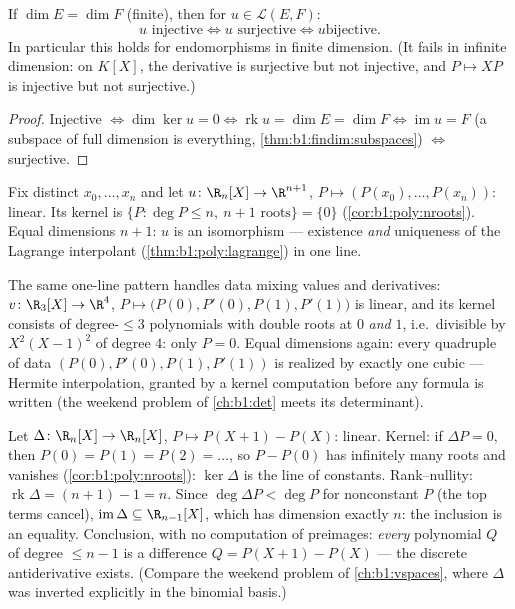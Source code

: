 \begin{corollary}\label{cor:b1:linmaps:samedim}
If $\dim E = \dim F$ (finite), then for $u \in \mathcal{L}(E, F)$:
\[
u \text{ injective} \iff u \text{ surjective} \iff u \text{
bijective}.
\]
In particular this holds for endomorphisms in finite dimension. (It
fails in infinite dimension: on $K[X]$, the derivative is surjective
but not injective, and $P \mapsto XP$ is injective but not
surjective.)
\end{corollary}

\begin{proof}
Injective $\iff \dim\ker u = 0 \iff \operatorname{rk} u = \dim E =
\dim F \iff \operatorname{im} u = F$ (a subspace of full dimension
is everything, \cref{thm:b1:findim:subspaces}) $\iff$ surjective.
\end{proof}

\begin{example}\label{ex:b1:linmaps:interpolation}
Fix distinct $x_0, \dots, x_n$ and let $u \colon \R_n[X] \to
\R^{n+1}$, $P \mapsto (P(x_0), \dots, P(x_n))$: linear. Its kernel
is $\{P : \deg P \leq n,\ n+1 \text{ roots}\} = \{0\}$
(\cref{cor:b1:poly:nroots}). Equal dimensions $n + 1$: $u$ is an
isomorphism --- existence \emph{and} uniqueness of the Lagrange
interpolant (\cref{thm:b1:poly:lagrange}) in one line.

The same one-line pattern handles data mixing values and
derivatives: $v \colon \R_3[X] \to \R^4$, $P \mapsto \bigl(P(0),
P'(0), P(1), P'(1)\bigr)$ is linear, and its kernel consists of
degree-$\leq 3$ polynomials with double roots at $0$ \emph{and}
$1$, i.e.\ divisible by $X^2(X-1)^2$ of degree $4$: only $P =
0$. Equal dimensions again: every quadruple of data $(P(0),
P'(0), P(1), P'(1))$ is realized by exactly one cubic ---
Hermite interpolation, granted by a kernel computation before
any formula is written (the weekend problem of \cref{ch:b1:det}
meets its determinant).
\end{example}

\begin{example}
\label{ex:b1:linmaps:delta}
Let $\Delta \colon \R_n[X] \to \R_n[X]$, $P \mapsto P(X+1) -
P(X)$: linear. Kernel: if $\Delta P = 0$, then $P(0) = P(1) =
P(2) = \dots$, so $P - P(0)$ has infinitely many roots and
vanishes (\cref{cor:b1:poly:nroots}): $\ker\Delta$ is the line of
constants. Rank--nullity: $\operatorname{rk}\Delta = (n + 1) - 1
= n$. Since $\deg \Delta P < \deg P$ for nonconstant $P$ (the top
terms cancel), $\operatorname{im}\Delta \subseteq \R_{n-1}[X]$,
which has dimension exactly $n$: the inclusion is an equality.
Conclusion, with no computation of preimages: \emph{every}
polynomial $Q$ of degree $\leq n - 1$ is a difference $Q = P(X+1)
- P(X)$ --- the discrete antiderivative exists. (Compare the
weekend problem of \cref{ch:b1:vspaces}, where $\Delta$ was
inverted explicitly in the binomial basis.)
\end{example}

